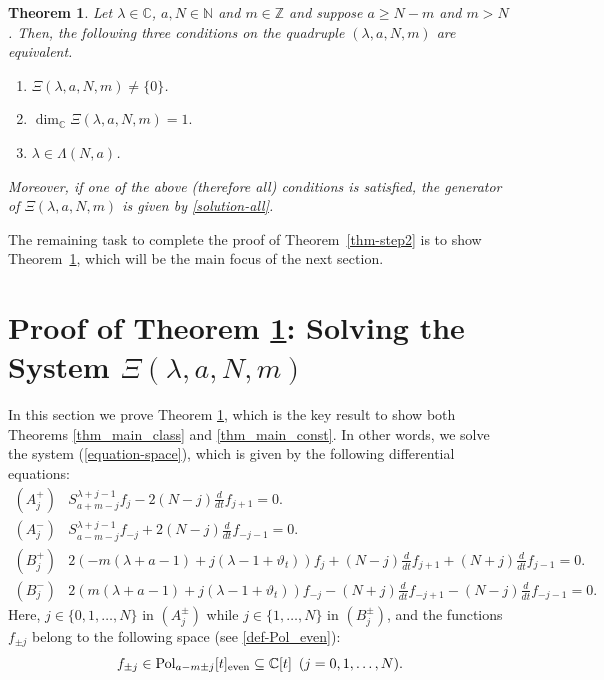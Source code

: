 \documentclass[12pt, pdflatex, a4paper]{article}
\theoremstyle{plain}
\newtheorem{thm}{Theorem}[section]
\theoremstyle{definition}
\def\C{{\mathbb C}}
\def\N{{\mathbb N}}
\def\Pol{\text{\normalfont{Pol}}}
\def\Z{{\mathbb Z}}
\begin{document}
\begin{thm}\label{Thm-solvingequations} Let $\lambda \in \C$, $a, N \in \N$ and $m \in \Z$ and suppose $a \geq N-m$ and $m > N$. Then, the following three conditions on the quadruple $(\lambda, a, N, m)$ are equivalent.
\begin{enumerate}[label=\normalfont{(\roman*)}, topsep=3pt]
\item $\Xi(\lambda, a, N, m) \neq \{0\}$.
\item $\dim_\C \Xi(\lambda, a, N, m)= 1.$
\item $\lambda \in \Lambda(N,a)$.
\end{enumerate}

Moreover, if one of the above (therefore all) conditions is satisfied, the generator of $\Xi(\lambda, a, N, m)$ is given by \eqref{solution-all}.
\end{thm}

The remaining task to complete the proof of Theorem~\ref{thm-step2} is to show Theorem~\ref{Thm-solvingequations}, which will be the main focus of the next section.

\section{Proof of Theorem \ref{Thm-solvingequations}: Solving the System $\Xi(\lambda, a, N, m)$}
\label{section-proof_of_solving_equations}

In this section we prove Theorem \ref{Thm-solvingequations}, which is the key result to show both Theorems \ref{thm_main_class} and \ref{thm_main_const}. In other words, we solve the system (\ref{equation-space}), which is given by the following differential equations:
\begin{equation}\label{ODEsystem}
\begin{array}{ll}
(A_j^+) & S_{a+m-j}^{\lambda+j-1} f_j - 2(N-j)\frac{d}{dt}f_{j+1} = 0.\\[6pt]

(A_j^-) & S_{a-m-j}^{\lambda+j-1} f_{-j} + 2(N-j)\frac{d}{dt}f_{-j-1} = 0.\\[6pt]

(B_j^+) & 2(-m(\lambda + a-1) + j(\lambda-1 + \vartheta_t))f_j 
+ (N-j)\frac{d}{dt}f_{j+1} +(N+j) \frac{d}{dt}f_{j-1} = 0.\\[6pt]

(B_j^-) & 2(m(\lambda + a-1) + j(\lambda-1 + \vartheta_t))f_{-j}
- (N+j)\frac{d}{dt}f_{-j+1} -(N-j) \frac{d}{dt}f_{-j-1} = 0.
\end{array}
\end{equation}
Here, $j \in \{0, 1, \ldots, N\}$ in $(A_j^\pm)$ while $j \in \{1, \ldots, N\}$ in $(B_j^\pm)$, and the functions $f_{\pm j}$ belong to the following space (see \eqref{def-Pol_even}):
\begin{equation}\label{condition-space-f+-j}
f_{\pm j}\in \Pol_{a-m\pm j}[t]_\text{{\normalfont{even}}} \subseteq \C[t]  \enspace (j = 0,1, \ldots, N).
\end{equation}
\end{document}
